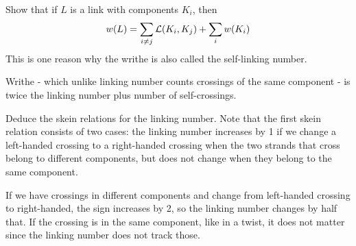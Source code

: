 \documentclass[10pt]{article}
\begin{document}
\begin{example}\label{b2e131}
	Show that if $L$ is a link with components $K_i$, then
	$$
	w(L) = \sum_{i\ne j}{\mathcal{L}}(K_i,K_j)+\sum_i w(K_i)
	$$
	This is one reason why the writhe is also called the self-linking number.
\end{example}
\sol Writhe - which unlike linking number counts crossings of the same component - is twice the linking number plus number of self-crossings.


\begin{example}
	Deduce the skein relations for the linking number. Note that the first skein relation consists of two cases: the linking number increases by 1 if we change a left-handed crossing to a right-handed crossing when the two strands that cross belong to different components, but does not change when they belong to the same component.
\end{example}
\sol If we have crossings in different components and change from left-handed crossing to right-handed, the sign increases by 2, so the linking number changes by half that. If the crossing is in the same component, like in a twist, it does not matter since the linking number does not track those.
\end{document}
